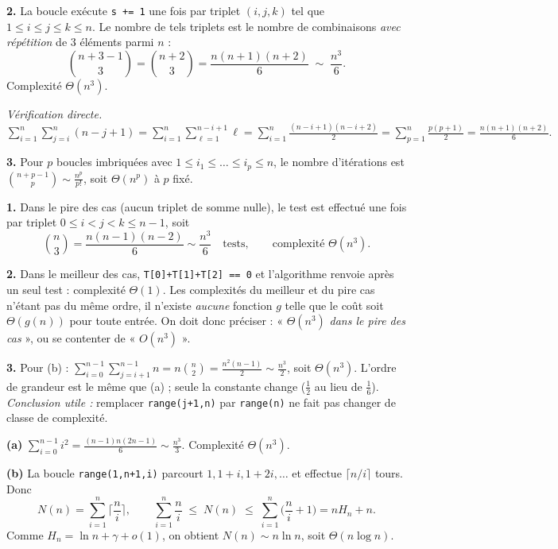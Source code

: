 \documentclass[11pt,a4paper]{article}
\begin{document}
\textbf{2.} La boucle exécute \texttt{s += 1} une fois par triplet $(i,j,k)$ tel que
$1\le i\le j\le k\le n$. Le nombre de tels triplets est le nombre de combinaisons
\emph{avec répétition} de $3$ éléments parmi $n$ :
\[
  \binom{n+3-1}{3} = \binom{n+2}{3} = \frac{n(n+1)(n+2)}{6}\;\sim\;\frac{n^3}{6}.
\]
Complexité $\Theta(n^3)$.

\smallskip
\emph{Vérification directe.} $\displaystyle\sum_{i=1}^{n}\sum_{j=i}^{n}(n-j+1)
=\sum_{i=1}^{n}\sum_{\ell=1}^{n-i+1}\ell
=\sum_{i=1}^{n}\frac{(n-i+1)(n-i+2)}{2}
=\sum_{p=1}^{n}\frac{p(p+1)}{2}=\frac{n(n+1)(n+2)}{6}.$

\textbf{3.} Pour $p$ boucles imbriquées avec $1\le i_1\le\dots\le i_p\le n$, le nombre
d'itérations est $\displaystyle\binom{n+p-1}{p}\sim\frac{n^p}{p!}$, soit $\Theta(n^p)$
à $p$ fixé.

\reponse
\textbf{1.} Dans le pire des cas (aucun triplet de somme nulle), le test est effectué
une fois par triplet $0\le i<j<k\le n-1$, soit
\[
  \binom{n}{3} = \frac{n(n-1)(n-2)}{6}\sim\frac{n^3}{6}\quad\text{tests},
  \qquad\text{complexité } \Theta(n^3).
\]

\textbf{2.} Dans le meilleur des cas, \texttt{T[0]+T[1]+T[2] == 0} et l'algorithme
renvoie après un seul test : complexité $\Theta(1)$.
Les complexités du meilleur et du pire cas n'étant pas du même ordre, il n'existe
\emph{aucune} fonction $g$ telle que le coût soit $\Theta(g(n))$ pour toute entrée.
On doit donc préciser : « $\Theta(n^3)$ \emph{dans le pire des cas} », ou se contenter
de « $O(n^3)$ ».

\textbf{3.} Pour (b) : $\displaystyle\sum_{i=0}^{n-1}\sum_{j=i+1}^{n-1} n
= n\binom{n}{2} = \frac{n^2(n-1)}{2}\sim\frac{n^3}{2}$, soit $\Theta(n^3)$.
L'ordre de grandeur est le même que (a) ; seule la constante change ($\tfrac12$ au lieu
de $\tfrac16$). \emph{Conclusion utile :} remplacer \texttt{range(j+1,n)} par
\texttt{range(n)} ne fait pas changer de classe de complexité.

\reponse
\textbf{(a)} $\displaystyle\sum_{i=0}^{n-1} i^2 = \frac{(n-1)n(2n-1)}{6}\sim\frac{n^3}{3}$.
Complexité $\Theta(n^3)$.

\textbf{(b)} La boucle \texttt{range(1,n+1,i)} parcourt $1, 1+i, 1+2i,\dots$ et effectue
$\big\lceil n/i\big\rceil$ tours. Donc
\[
  N(n)=\sum_{i=1}^{n}\Big\lceil \frac n i\Big\rceil,
  \qquad \sum_{i=1}^{n}\frac n i \;\le\; N(n)\;\le\; \sum_{i=1}^{n}\Big(\frac n i +1\Big)
  = n H_n + n .
\]
Comme $H_n = \ln n + \gamma + o(1)$, on obtient $N(n) \sim n\ln n$, soit
$\boxed{\Theta(n\log n)}$.
\end{document}

